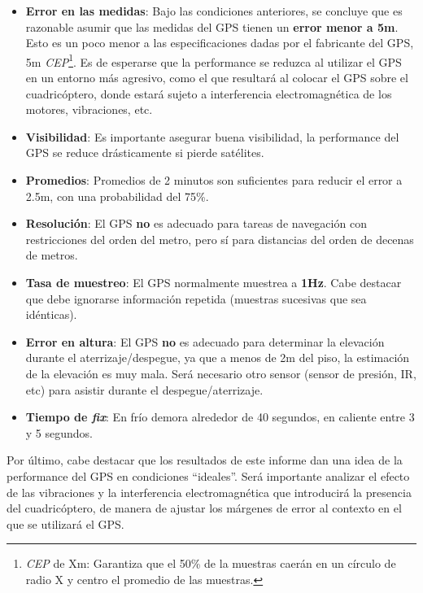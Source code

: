 \documentclass[spanish,12pt,a4paper,titlepage]{report}
\begin{document}
\begin{itemize}
\item \textbf{Error en las medidas}: Bajo las condiciones anteriores, se concluye que es razonable asumir que las medidas del GPS tienen un \textbf{error menor a 5m}. Esto es un poco menor a las especificaciones dadas por el fabricante del GPS, 5m \emph{CEP}\footnote{\textit{CEP} de Xm: Garantiza que el 50\% de la muestras caerán en un círculo de radio X y centro el promedio de las muestras.}. Es de esperarse que la performance se reduzca al utilizar el GPS en un entorno más agresivo, como el que resultará al colocar el GPS sobre el cuadricóptero, donde estará sujeto a  interferencia electromagnética de los motores, vibraciones, etc.
\item \textbf{Visibilidad}: Es importante asegurar buena visibilidad, la performance del GPS se reduce drásticamente si pierde satélites.
\item \textbf{Promedios}: Promedios de 2 minutos son suficientes para reducir el error a 2.5m, con una probabilidad del 75\%.
\item \textbf{Resolución}: El GPS \textbf{no} es adecuado para tareas de navegación con restricciones del orden del metro, pero sí para distancias del orden de decenas de metros.
\item \textbf{Tasa de muestreo}: El GPS normalmente muestrea a \textbf{1Hz}. Cabe destacar que debe ignorarse información repetida (muestras sucesivas que sea idénticas).
\item \textbf{Error en altura}: El GPS \textbf{no} es adecuado para determinar la elevación durante el aterrizaje/despegue, ya que a menos de 2m del piso, la estimación de la elevación es muy mala. Será necesario otro sensor (sensor de presión, IR, etc) para asistir durante el despegue/aterrizaje.
\item \textbf{Tiempo de \textit{fix}}: En frío demora alrededor de 40 segundos, en caliente entre 3 y 5 segundos.
\end{itemize}

Por último, cabe destacar que los resultados de este informe dan una idea de la performance del GPS en condiciones ``ideales''. Será importante analizar el efecto de las vibraciones y la interferencia electromagnética que introducirá la presencia del cuadricóptero, de manera de ajustar los márgenes de error al contexto en el que se utilizará el GPS.
\end{document}
